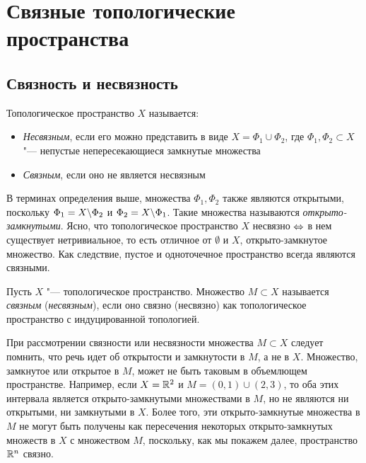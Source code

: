 \section{Связные топологические пространства}

\subsection{Связность и несвязность}

\begin{definition}
	Топологическое пространство $X$ называется:
	\begin{itemize}
		\item \textit{Несвязным}, если его можно представить в виде $X = \Phi_1\cup \Phi_2$, где $\Phi_1, \Phi_2 \subset X$ "--- не\-пус\-тые непересекающиеся замкнутые множества
		
		\item \textit{Связным}, если оно не является несвязным
	\end{itemize}
\end{definition}

\begin{note}
	В терминах определения выше, множества $\Phi_1, \Phi_2$ также являются открытыми, поскольку $\Phi_1 = X \backslash \Phi_2$ и $\Phi_2 = X \backslash \Phi_1$. Такие множества называются \textit{открыто-замкнутыми}. Ясно, что топологическое пространство $X$ несвязно $\Leftrightarrow$ в нем существует нетривиальное, то есть отличное от $\emptyset$ и $X$, открыто-замкнутое множество. Как следствие, пустое и одноточечное пространство всегда являются связными.
\end{note}

\begin{definition}
	Пусть $X$ "--- топологическое пространство. Множество $M \subset X$ называется \textit{связным} (\textit{несвязным}), если оно связно (несвязно) как топологическое пространство с индуцированной топологией.
\end{definition}

\begin{note}
	При рассмотрении связности или несвязности множества $M \subset X$ следует помнить, что речь идет об открытости и замкнутости в $M$, а не в $X$. Множество, замкнутое или открытое в $M$, может не быть таковым в объемлющем пространстве. Например, если $X = \mathbb{R}^2$ и $M = (0, 1) \cup (2, 3)$, то оба этих интервала является открыто-замкнутыми множествами в $M$, но не являются ни открытыми, ни замкнутыми в $X$. Более того, эти открыто-замкнутые множества в $M$ не могут быть получены как пересечения некоторых открыто-замкнутых множеств в $X$ с множеством $M$, поскольку, как мы покажем далее, пространство $\mathbb{R}^n$ связно.
\end{note}

